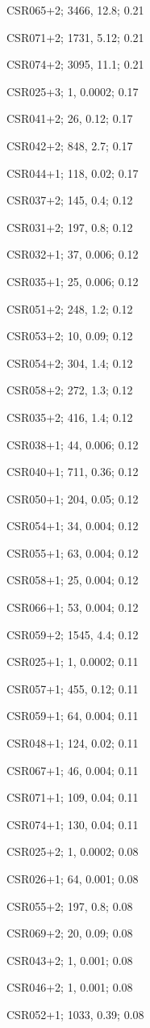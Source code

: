 CSR065+2; 3466, 12.8; 0.21

CSR071+2; 1731, 5.12; 0.21

CSR074+2; 3095, 11.1; 0.21



CSR025+3; 1, 0.0002; 0.17

CSR041+2; 26, 0.12; 0.17

CSR042+2; 848, 2.7; 0.17

CSR044+1; 118, 0.02; 0.17



CSR037+2; 145, 0.4; 0.12

CSR031+2; 197, 0.8; 0.12

CSR032+1; 37, 0.006; 0.12

CSR035+1; 25, 0.006; 0.12

CSR051+2; 248, 1.2; 0.12

CSR053+2; 10, 0.09; 0.12

CSR054+2; 304, 1.4; 0.12

CSR058+2; 272, 1.3; 0.12

CSR035+2; 416, 1.4; 0.12

CSR038+1; 44, 0.006; 0.12

CSR040+1; 711, 0.36; 0.12

CSR050+1; 204, 0.05; 0.12

CSR054+1; 34, 0.004; 0.12

CSR055+1; 63, 0.004; 0.12

CSR058+1; 25, 0.004; 0.12

CSR066+1; 53, 0.004; 0.12

CSR059+2; 1545, 4.4; 0.12



CSR025+1; 1, 0.0002; 0.11

CSR057+1; 455, 0.12; 0.11

CSR059+1; 64, 0.004; 0.11

CSR048+1; 124, 0.02; 0.11

CSR067+1; 46, 0.004; 0.11

CSR071+1; 109, 0.04; 0.11

CSR074+1; 130, 0.04; 0.11

CSR025+2; 1, 0.0002; 0.08

CSR026+1; 64, 0.001; 0.08

CSR055+2; 197, 0.8; 0.08

CSR069+2; 20, 0.09; 0.08

CSR043+2; 1, 0.001; 0.08 

CSR046+2; 1, 0.001; 0.08

CSR052+1; 1033, 0.39; 0.08

